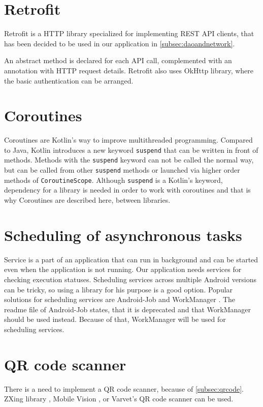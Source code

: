 \section{Retrofit}
Retrofit is a HTTP library specialized for implementing REST API clients, that has been decided to be used in our application in \autoref{subsec:daoandnetwork}.

An abstract method is declared for each API call, complemented with an annotation with HTTP request details.
Retrofit also uses OkHttp \cite{okhttp} library, where the basic authentication can be arranged.

\section{Coroutines}
Coroutines are Kotlin's way to improve multithreaded programming.
Compared to Java, Kotlin introduces a new keyword \verb|suspend| that can be written in front of methods.
Methods with the \verb|suspend| keyword can not be called the normal way, but can be called from other \verb|suspend| methods or launched via higher order methods of \verb|CoroutineScope|.
Although \verb|suspend| is a Kotlin's keyword, dependency for a library is needed in order to work with coroutines and that is why Coroutines are described here, between libraries.

\section{Scheduling of asynchronous tasks}
Service is a part of an application that can run in background and can be started even when the application is not running.
Our application needs services for checking execution statuses.
Scheduling services across multiple Android versions can be tricky, so using a library for his purpose is a good option.
Popular solutions for scheduling services are Android-Job \cite{androidjob} and WorkManager \cite{workmanager}.
The readme file of Android-Job states, that it is deprecated and that WorkManager should be used instead. \cite{androidjob}
Because of that, WorkManager will be used for scheduling services.

\section{QR code scanner}
There is a need to implement a QR code scanner, because of \autoref{subsec:qrcode}.
ZXing library \cite{zxing}, Mobile Vision \cite{vision}, or Varvet's QR code scanner \cite{varvet} can be used.

